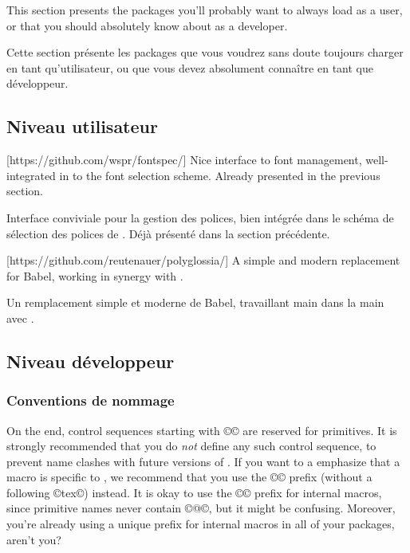 \documentclass{lltxdoc}
\begin{document}
This section presents the packages you'll probably want to always load as a
user, or that you should absolutely know about as a developer.

Cette section présente les packages que vous voudrez sans doute toujours charger en tant qu'utilisateur, ou que vous devez absolument connaître en tant que développeur.

\subsection{Niveau utilisateur}

[https://github.com/wspr/fontspec/]
Nice interface to font management, well-integrated in to the \latex font
selection scheme. Already presented in the previous section.

Interface conviviale pour la gestion des polices, bien intégrée dans le schéma de sélection des polices de \latex. Déjà présenté dans la section précédente.

[https://github.com/reutenauer/polyglossia/]
A simple and modern replacement for Babel, working in synergy with .

Un remplacement simple et moderne de Babel, travaillant main dans la main avec .

\subsection{Niveau développeur}

\subsubsection{Conventions de nommage}

On the \tex end, control sequences starting with ©\luatex© are reserved for
primitives. It is strongly recommended that you do \emph{not} define any such
control sequence, to prevent name clashes with future versions of \luatex. If
you want to a emphasize that a macro is specific to \luatex, we recommend that
you use the ©\lua© prefix (without a following ©tex©) instead. It is okay to
use the ©\luatex@© prefix for internal macros, since primitive names never
contain ©@©, but it might be confusing. Moreover, you're already using a
unique prefix for internal macros in all of your packages, aren't you?
\end{document}
